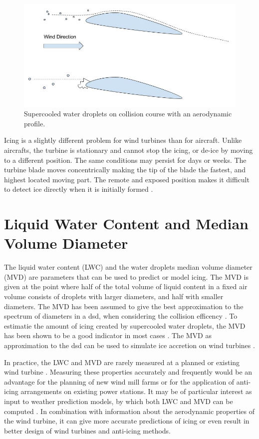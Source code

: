 \begin{figure}%
\centering\includegraphics[width=0.8\linewidth]{./figures/freezing_droplets.jpg}
\caption{Supercooled water droplets on collision course with an aerodynamic profile.}
\label{fig:freezedrops}
\end{figure}

Icing is a slightly different problem for wind turbines than for aircraft. Unlike aircrafts, the turbine is stationary and cannot stop the icing, or de-ice by moving to a different position. The same conditions may persist for days or weeks. The turbine blade moves concentrically making the tip of the blade the fastest, and highest located moving part. The remote and exposed position makes it difficult to detect ice directly when it is initially formed \cite{homo2006}.

\section{Liquid Water Content and Median Volume Diameter}

The liquid water content (LWC) and the water droplets median volume diameter (MVD) are parameters that can be used to predict or model icing. The  MVD is given at the point where half of the total volume of liquid content in a fixed air volume consists of droplets with larger diameters, and half with smaller diameters. The MVD has been assumed to give the best approximation to the spectrum of diameters in a \gls{dsd}, when considering the collision efficency \cite{fins1988}. To estimatie the amount of icing created by supercooled water droplets, the MVD has been shown to be a good indicator in most cases \cite{makk2000}. The MVD as approximation to the \gls{dsd} can be used to simulate ice accretion on wind turbines \cite{dier2011}.

In practice, the LWC and MVD are rarely measured at a planned or existing wind turbine \cite{parent2011, makk1992}. Measuring these properties accurately and frequently would be an advantage for the planning of new wind mill farms or for the application of anti-icing arrangements on existing power stations. It may be of particular interest as input to weather prediction models, by which both LWC and MVD can be computed \cite{thomp2009, nyga2011}. In combination with information about the aerodynamic properties of the wind turbine, it can give more accurate predictions of icing or even result in better design of wind turbines and anti-icing methods.

